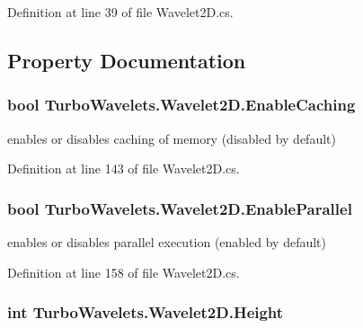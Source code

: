 \-Definition at line 39 of file \-Wavelet2\-D.\-cs.



\subsection{\-Property \-Documentation}
\hypertarget{class_turbo_wavelets_1_1_wavelet2_d_abbd41e51d24f8a7912ae47dd364ed4fb}{
\subsubsection[{\-Enable\-Caching}]{\setlength{\rightskip}{0pt plus 5cm}bool {\bf \-Turbo\-Wavelets.\-Wavelet2\-D.\-Enable\-Caching}}}\label{class_turbo_wavelets_1_1_wavelet2_d_abbd41e51d24f8a7912ae47dd364ed4fb}


enables or disables caching of memory (disabled by default) 



\-Definition at line 143 of file \-Wavelet2\-D.\-cs.

\hypertarget{class_turbo_wavelets_1_1_wavelet2_d_abec21e54c6ab8cce0e02ef3ad64ae5af}{
\subsubsection[{\-Enable\-Parallel}]{\setlength{\rightskip}{0pt plus 5cm}bool {\bf \-Turbo\-Wavelets.\-Wavelet2\-D.\-Enable\-Parallel}}}\label{class_turbo_wavelets_1_1_wavelet2_d_abec21e54c6ab8cce0e02ef3ad64ae5af}


enables or disables parallel execution (enabled by default) 



\-Definition at line 158 of file \-Wavelet2\-D.\-cs.

\hypertarget{class_turbo_wavelets_1_1_wavelet2_d_a277d0f89d73f839350c64a83ccd76ff6}{
\subsubsection[{\-Height}]{\setlength{\rightskip}{0pt plus 5cm}int {\bf \-Turbo\-Wavelets.\-Wavelet2\-D.\-Height}}}\label{class_turbo_wavelets_1_1_wavelet2_d_a277d0f89d73f839350c64a83ccd76ff6}


